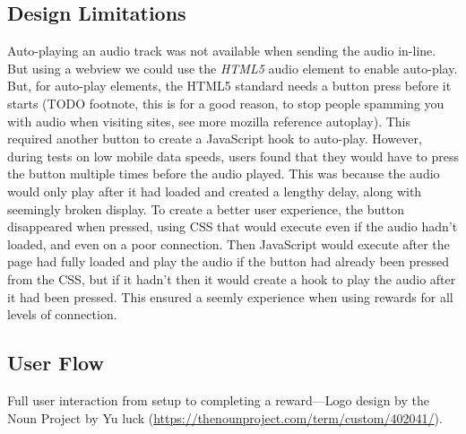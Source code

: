 \subsection*{Design Limitations}

Auto-playing an audio track was not available when sending the audio in-line. But using a webview we could use the \textit{HTML5} audio element to enable auto-play.
But, for auto-play elements, the HTML5 standard needs a button press before it starts (TODO footnote, this is for a good reason, to stop people spamming you with audio when visiting sites, see more mozilla reference autoplay).
This required another button to create a JavaScript hook to auto-play.
However, during tests on low mobile data speeds, users found that they would have to press the button multiple times before the audio played.
This was because the audio would only play after it had loaded and created a lengthy delay, along with seemingly broken display.
To create a better user experience, the button disappeared when pressed, using CSS that would execute even if the audio hadn't loaded, and even on a poor connection.
Then JavaScript would execute after the page had fully loaded and play the audio if the button had already been pressed from the CSS, but if it hadn't then it would create a hook to play the audio after it had been pressed.
This ensured a seemly experience when using rewards for all levels of connection.

\subsection{User Flow}

Full user interaction from setup to completing a reward---Logo design by the Noun Project by Yu luck (\url{https://thenounproject.com/term/custom/402041/}).

